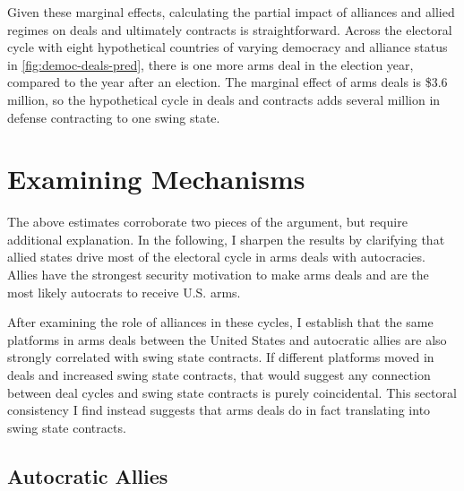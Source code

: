 \documentclass[12pt]{article}
\begin{document}
Given these marginal effects, calculating the partial impact of alliances and allied regimes on deals and ultimately contracts is straightforward. 
Across the electoral cycle with eight hypothetical countries of varying democracy and alliance status in \autoref{fig:democ-deals-pred}, there is one more arms deal in the election year, compared to the year after an election. 
The marginal effect of arms deals is \$3.6 million, so the hypothetical cycle in deals and contracts adds several million in defense contracting to one swing state. 
%
%


\section{Examining Mechanisms}


The above estimates corroborate two pieces of the argument, but require additional explanation. 
In the following, I sharpen the results by clarifying that allied states drive most of the electoral cycle in arms deals with autocracies. 
Allies have the strongest security motivation to make arms deals and are the most likely autocrats to receive U.S. arms. 

After examining the role of alliances in these cycles, I establish that the same platforms in arms deals between the United States and autocratic allies are also strongly correlated with swing state contracts.
If different platforms moved in deals and increased swing state contracts, that would suggest any connection between deal cycles and swing state contracts is purely coincidental.
This sectoral consistency I find instead suggests that arms deals do in fact translating into swing state contracts. 



\subsection{Autocratic Allies}
\end{document}
